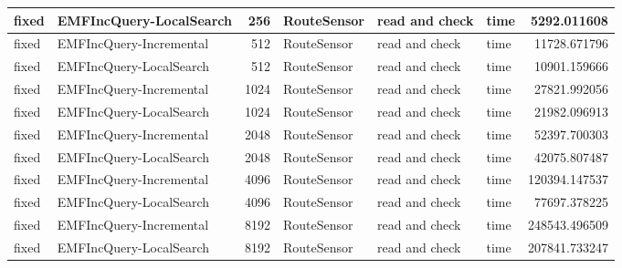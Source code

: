 \begin{table}
\begin{tabular}{| l | l | r | l | l | l | r |}
fixed & EMFIncQuery-LocalSearch & 256 & RouteSensor & read and check & time & 5292.011608\\\hline
fixed & EMFIncQuery-Incremental & 512 & RouteSensor & read and check & time & 11728.671796\\\hline
fixed & EMFIncQuery-LocalSearch & 512 & RouteSensor & read and check & time & 10901.159666\\\hline
fixed & EMFIncQuery-Incremental & 1024 & RouteSensor & read and check & time & 27821.992056\\\hline
fixed & EMFIncQuery-LocalSearch & 1024 & RouteSensor & read and check & time & 21982.096913\\\hline
fixed & EMFIncQuery-Incremental & 2048 & RouteSensor & read and check & time & 52397.700303\\\hline
fixed & EMFIncQuery-LocalSearch & 2048 & RouteSensor & read and check & time & 42075.807487\\\hline
fixed & EMFIncQuery-Incremental & 4096 & RouteSensor & read and check & time & 120394.147537\\\hline
fixed & EMFIncQuery-LocalSearch & 4096 & RouteSensor & read and check & time & 77697.378225\\\hline
fixed & EMFIncQuery-Incremental & 8192 & RouteSensor & read and check & time & 248543.496509\\\hline
fixed & EMFIncQuery-LocalSearch & 8192 & RouteSensor & read and check & time & 207841.733247\\\hline


\end{tabular}
\end{table}
